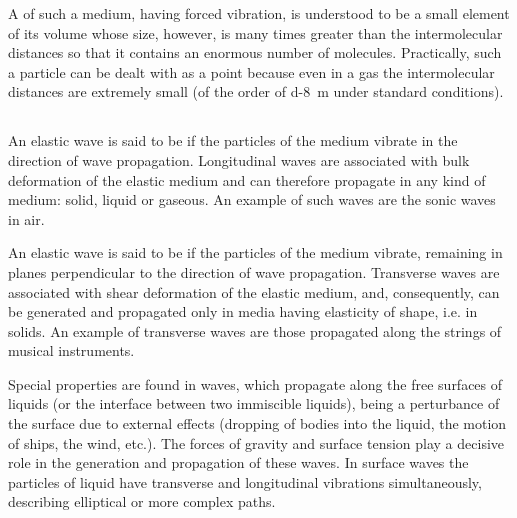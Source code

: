 A  of such a medium, having forced vibration, is understood to be a small element of its volume whose size, however, is many times greater than the intermolecular distances so that it contains an enormous number of molecules. Practically, such a particle can be dealt with as a point because even in a gas the intermolecular distances are extremely small (of the order of \SI{d-8}{\meter} under standard conditions).

\subsection{}\label{30.1.5} An elastic wave is said to be  if the particles of the medium vibrate in the direction of wave propagation. Longitudinal waves are associated with bulk deformation of the elastic medium and can therefore propagate in any kind of medium: solid, liquid or gaseous. An example of such waves are the sonic waves in air.

An elastic wave is said to be  if the particles of the medium vibrate, remaining in planes perpendicular to the direction of wave propagation. Transverse waves are associated with shear deformation of the elastic medium, and, consequently, can be generated and propagated only in media having elasticity of shape, i.e. in solids. An example of transverse waves are
those propagated along the strings of musical instruments. 

Special properties are found in  waves, which propagate along the free surfaces of liquids (or the interface between two immiscible liquids), being a perturbance of the surface due to external effects (dropping of bodies into the liquid, the motion of ships, the wind, etc.). The forces of gravity and surface tension play a decisive role in the generation and propagation of these waves. In surface waves the particles of liquid have transverse and longitudinal vibrations simultaneously, describing elliptical or more complex paths.

